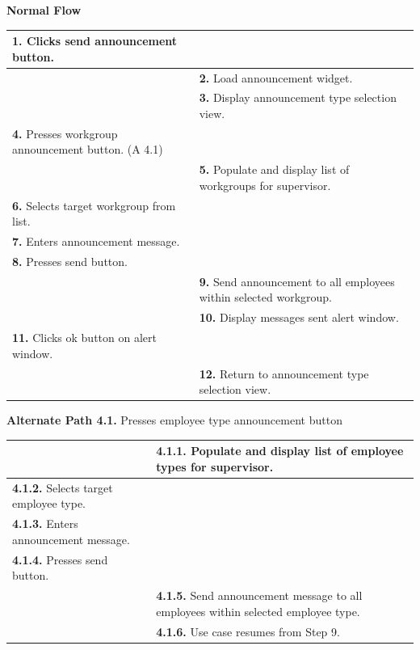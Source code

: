 \documentclass[letterpaper,12pt]{report}
\begin{document}
{ \centering \textbf{Normal Flow}
\begin{center}
\xuchead
\begin{tabular}{| p{8.5cm} | p{8.5cm} |}
\hline
\textbf{1.} Clicks send announcement button. & \\
\hline
& \textbf{2.} Load announcement widget. \\
\hline
& \textbf{3.} Display announcement type selection view. \\
\hline
\textbf{4.} Presses workgroup announcement button. (A 4.1) & \\
\hline
& \textbf{5.} Populate and display list of workgroups for supervisor. \\
\hline
\textbf{6.} Selects target workgroup from list. & \\
\hline
\textbf{7.} Enters announcement message. & \\
\hline
\textbf{8.} Presses send button. & \\
\hline
& \textbf{9.} Send announcement to all employees within selected workgroup. \\
\hline
& \textbf{10.} Display messages sent alert window. \\
\hline
\textbf{11.} Clicks ok button on alert window. & \\
\hline
& \textbf{12.} Return to announcement type selection view. \\
\hline
\end{tabular}
\end{center}
\pagebreak
\centering \textbf{Alternate Path 4.1.}
\linebreak Presses employee type announcement button
\begin{center}
\xuchead
\begin{tabular}{| p{8.5cm} | p{8.5cm} |}
\hline
& \textbf{4.1.1.} Populate and display list of employee types for supervisor. \\
\hline
\textbf{4.1.2.} Selects target employee type. & \\
\hline
\textbf{4.1.3.} Enters announcement message. & \\
\hline
\textbf{4.1.4.} Presses send button. & \\
\hline
& \textbf{4.1.5.} Send announcement message to all employees within selected employee type. \\
\hline
& \textbf{4.1.6.} Use case\index{Use Case} resumes from Step 9. \\
\hline
\end{tabular}
\end{center}


}
\end{document}
